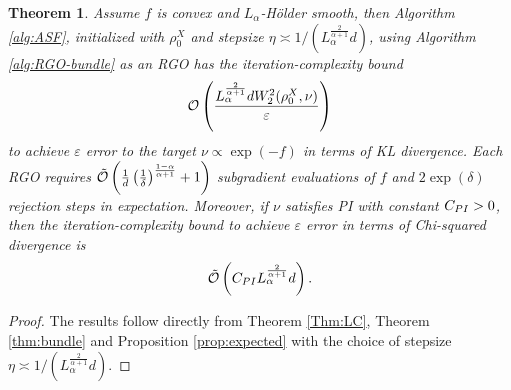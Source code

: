 \documentclass[11pt,letterpaper]{article}
\newcommand{\chen}{\color{cyan}}
\newtheorem{theorem}[thm]{Theorem}
\begin{document}


\begin{theorem}\label{thm:semi}
Assume $f$ is convex and $L_\alpha$-Hölder smooth, then Algorithm \ref{alg:ASF}, initialized with $\rho_0^X$ and stepsize $\eta \asymp 1/(L_\alpha^\frac{2}{\alpha+1} d)$, using Algorithm \ref{alg:RGO-bundle} as an RGO has the iteration-complexity bound 
    \[
        {\cal O}\left(\frac{L_\alpha^\frac{2}{\alpha+1} d W_2^2(\rho_0^X,\nu)}{\varepsilon}\right)
    \]
to achieve $\varepsilon$ error to the target $\nu\propto \exp(-f)$ in terms of KL divergence. Each RGO requires $\tilde {\cal O}\left(\frac{1}{d} \left(\frac{1}{\delta}\right)^{\frac{1-\alpha}{\alpha+1}} + 1\right)$ subgradient evaluations of $f$ and $2\exp( \delta)$ rejection steps in expectation. 
Moreover, if $\nu$ satisfies PI with constant $C_{\rm PI}>0$, 
then the iteration-complexity bound to achieve $\varepsilon$ error in terms of Chi-squared divergence is 
\[
\tilde{\cal O}\left(C_{\rm PI}L_\alpha^\frac{2}{\alpha+1} d \right).
\]
\end{theorem}


\begin{proof}
The results follow directly from Theorem \ref{Thm:LC}, Theorem \ref{thm:bundle} and Proposition \ref{prop:expected} with the choice of stepsize $\eta \asymp 1/(L_\alpha^\frac{2}{\alpha+1} d)$.
\end{proof}



\end{document}
